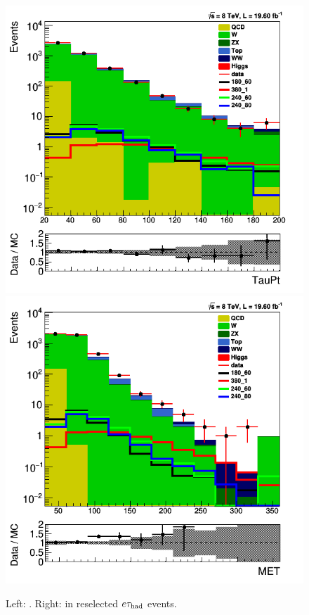 \begin{figure}[!Hhtb]
\centering
\includegraphics[angle=0,scale=0.375]{SelectionEleTau/TauPt.png}
\includegraphics[angle=0,scale=0.375]{SelectionEleTau/MET.png}
\caption{Left: \Tau\PT. Right: \MPT in reselected $e\tau_{\rm had}$ events.}
\label{fig:datamceletau}
\end{figure}

